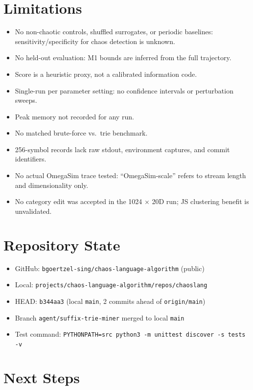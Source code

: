 \documentclass[11pt]{article}
\begin{document}
\section{Limitations}

\begin{itemize}
\item No non-chaotic controls, shuffled surrogates, or periodic baselines: sensitivity/specificity for chaos detection is unknown.
\item No held-out evaluation: M1 bounds are inferred from the full trajectory.
\item Score is a heuristic proxy, not a calibrated information code.
\item Single-run per parameter setting: no confidence intervals or perturbation sweeps.
\item Peak memory not recorded for any run.
\item No matched brute-force vs.\ trie benchmark.
\item 256-symbol records lack raw stdout, environment captures, and commit identifiers.
\item No actual OmegaSim trace tested: ``OmegaSim-scale'' refers to stream length and dimensionality only.
\item No category edit was accepted in the 1024 $\times$ 20D run; JS clustering benefit is unvalidated.
\end{itemize}

\section{Repository State}

\begin{itemize}
\item GitHub: \texttt{bgoertzel-sing/chaos-language-algorithm} (public)
\item Local: \texttt{projects/chaos-language-algorithm/repos/chaoslang}
\item HEAD: \texttt{b344aa3} (local \texttt{main}, 2 commits ahead of \texttt{origin/main})
\item Branch \texttt{agent/suffix-trie-miner} merged to local \texttt{main}
\item Test command: \texttt{PYTHONPATH=src python3 -m unittest discover -s tests -v}
\end{itemize}

\section{Next Steps}
\end{document}
